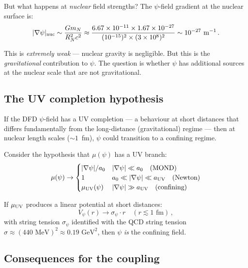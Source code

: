 \documentclass[aps,prd,twocolumn,superscriptaddress,floatfix,nofootinbib]{revtex4-2}
\newcommand{\mufunction}{\mu}
\begin{document}
But what happens at \emph{nuclear} field strengths? The $\psi$-field gradient at
the nuclear surface is:
\begin{equation}
|\nabla\psi|_{\rm nuc} \sim \frac{G m_N}{R_N^2 c^2} \approx \frac{6.67 \times
10^{-11} \times 1.67 \times 10^{-27}}{(10^{-15})^2 \times (3 \times 10^8)^2}
\sim 10^{-27} \text{ m}^{-1} \, .
\end{equation}

This is \emph{extremely weak} --- nuclear gravity is negligible. But this is the
\emph{gravitational} contribution to $\psi$. The question is whether $\psi$ has
additional sources at the nuclear scale that are not gravitational.

\subsection{The UV completion hypothesis}

If the DFD $\psi$-field has a UV completion --- a behaviour at short distances
that differs fundamentally from the long-distance (gravitational) regime --- then
at nuclear length scales ($\sim 1$~fm), $\psi$ could transition to a confining
regime.

Consider the hypothesis that $\mufunction(\psi)$ has a UV branch:
\begin{equation}
\mufunction(\psi) \to
\begin{cases}
|\nabla\psi|/a_0 & |\nabla\psi| \ll a_0 \quad (\text{MOND}) \\
1 & a_0 \ll |\nabla\psi| \ll a_{\rm UV} \quad (\text{Newton}) \\
\mufunction_{\rm UV}(\psi) & |\nabla\psi| \gg a_{\rm UV} \quad (\text{confining})
\end{cases}
\label{eq:mu_UV}
\end{equation}

If $\mufunction_{\rm UV}$ produces a linear potential at short distances:
\begin{equation}
V_\psi(r) \to \sigma_\psi \cdot r \quad (r \lesssim 1 \text{ fm}) \, ,
\end{equation}
with string tension $\sigma_\psi$ identified with the QCD string tension $\sigma
\approx (440 \text{ MeV})^2 \approx 0.19 \text{ GeV}^2$, then $\psi$ \emph{is}
the confining field.

\subsection{Consequences for the coupling}
\end{document}

